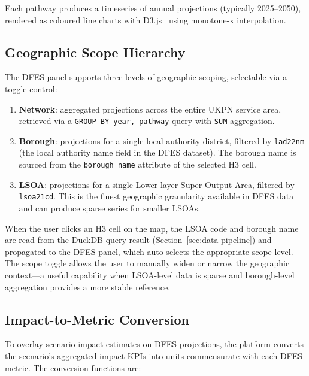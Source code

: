 \noindent Each pathway produces a timeseries of annual projections (typically 2025--2050), rendered as coloured line charts with D3.js~\cite{bostock2011d3} using monotone-x interpolation.

\subsection{Geographic Scope Hierarchy}
\label{sec:scope-toggle}

The DFES panel supports three levels of geographic scoping, selectable via a toggle control:

\begin{enumerate}[nosep]
    \item \textbf{Network}: aggregated projections across the entire UKPN service area, retrieved via a \texttt{GROUP BY year, pathway} query with \texttt{SUM} aggregation.
    \item \textbf{Borough}: projections for a single local authority district, filtered by \texttt{lad22nm} (the local authority name field in the DFES dataset). The borough name is sourced from the \texttt{borough\_name} attribute of the selected H3 cell.
    \item \textbf{LSOA}: projections for a single Lower-layer Super Output Area, filtered by \texttt{lsoa21cd}. This is the finest geographic granularity available in DFES data and can produce sparse series for smaller LSOAs.
\end{enumerate}

\noindent When the user clicks an H3 cell on the map, the LSOA code and borough name are read from the DuckDB query result (Section~\ref{sec:data-pipeline}) and propagated to the DFES panel, which auto-selects the appropriate scope level. The scope toggle allows the user to manually widen or narrow the geographic context---a useful capability when LSOA-level data is sparse and borough-level aggregation provides a more stable reference.

\subsection{Impact-to-Metric Conversion}
\label{sec:metric-conversion}

To overlay scenario impact estimates on DFES projections, the platform converts the scenario's aggregated impact KPIs into units commensurate with each DFES metric. The conversion functions are:

